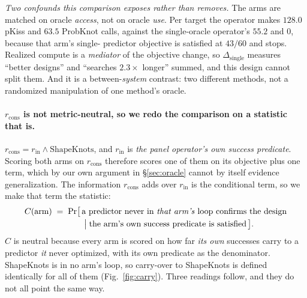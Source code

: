 \documentclass[11pt]{article}
\begin{document}
\emph{Two confounds this comparison exposes rather than removes.} The arms are matched on oracle \emph{access}, not on oracle \emph{use}. Per target the operator makes $128.0$
pKiss and $63.5$ ProbKnot calls, against the single-oracle operator's $55.2$ and $0$, because that arm's single-
predictor objective is satisfied at $43/60$ and stops. Realized compute is a \emph{mediator} of the objective change, so
$\Delta_{\mathrm{single}}$ measures ``better designs'' and ``searches $2.3\times$ longer'' summed, and this
design cannot split them. And it is a between-\emph{system} contrast: two different methods, not a randomized
manipulation of one method's oracle.

\paragraph{$r_{\mathrm{cons}}$ is not metric-neutral, so we redo the comparison on a statistic that is.}
$r_{\mathrm{cons}}=r_{\mathrm{in}}\wedge\text{ShapeKnots}$, and $r_{\mathrm{in}}$ is \emph{the panel operator's
own success predicate}. Scoring both arms on $r_{\mathrm{cons}}$ therefore scores one of them on its objective
plus one term, which by our own argument in \S\ref{sec:oracle} cannot by itself evidence generalization. The
information $r_{\mathrm{cons}}$ adds over $r_{\mathrm{in}}$ is the conditional term, so we make that term the
statistic:
\begin{equation}\label{eq:carry}
\begin{aligned}
  C(\text{arm}) \;=\; \Pr\bigl[\,&\text{a predictor never in \emph{that arm's} loop confirms the design}\\[-1pt]
  &\;\big|\; \text{the arm's own success predicate is satisfied}\,\bigr].
\end{aligned}
\end{equation}
$C$ is neutral because every arm is scored on how far \emph{its own} successes carry to a predictor \emph{it}
never optimized, with its own predicate as the denominator. ShapeKnots is in no arm's loop, so carry-over to
ShapeKnots is defined identically for all of them (Fig.~\ref{fig:carry}). Three readings follow, and they do
not all point the same way.
\end{document}
